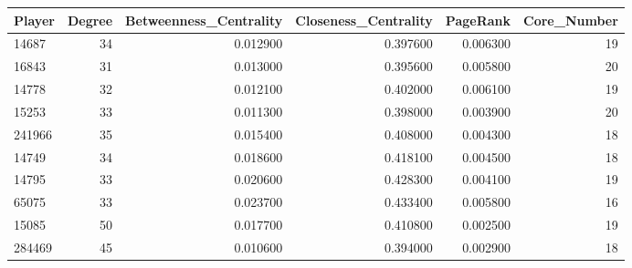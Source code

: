 \begin{tabular}{lrrrrr}
\toprule
Player & Degree & Betweenness\_Centrality & Closeness\_Centrality & PageRank & Core\_Number \\
\midrule
14687 & 34 & 0.012900 & 0.397600 & 0.006300 & 19 \\
16843 & 31 & 0.013000 & 0.395600 & 0.005800 & 20 \\
14778 & 32 & 0.012100 & 0.402000 & 0.006100 & 19 \\
15253 & 33 & 0.011300 & 0.398000 & 0.003900 & 20 \\
241966 & 35 & 0.015400 & 0.408000 & 0.004300 & 18 \\
14749 & 34 & 0.018600 & 0.418100 & 0.004500 & 18 \\
14795 & 33 & 0.020600 & 0.428300 & 0.004100 & 19 \\
65075 & 33 & 0.023700 & 0.433400 & 0.005800 & 16 \\
15085 & 50 & 0.017700 & 0.410800 & 0.002500 & 19 \\
284469 & 45 & 0.010600 & 0.394000 & 0.002900 & 18 \\
\bottomrule
\end{tabular}
